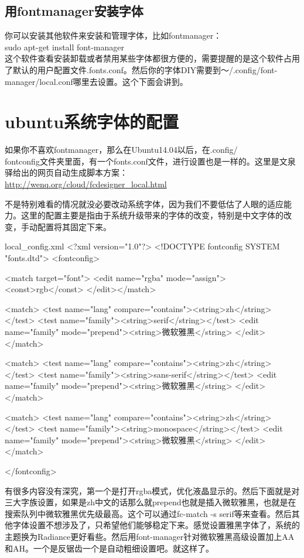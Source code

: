 \documentclass[11pt,oneside]{book}
\begin{document}
\subsection{用fontmanager安装字体}
你可以安装其他软件来安装和管理字体，比如fontmanager：\\
sudo  apt-get install font-manager  \\
这个软件查看安装卸载或者禁用某些字体都很方便的，需要提醒的是这个软件占用了默认的用户配置文件.fonts.conf。然后你的字体DIY需要到～/.config/font-manager/local.conf哪里去设置。这个下面会讲到。



\section{ubuntu系统字体的配置}
如果你不喜欢fontmanager，那么在Ubuntu14.04以后，在.config/\\fontconfig文件夹里面，有一个fonts.conf文件，进行设置也是一样的。这里是文泉驿给出的网页自动生成脚本方案：\\ \href{http://wenq.org/cloud/fcdesigner_local.html}{http://wenq.org/cloud/fcdesigner\_local.html}

不是特别难看的情况就没必要改动系统字体，因为我们不要低估了人眼的适应能力。这里的配置主要是指由于系统升级带来的字体的改变，特别是中文字体的改变，手动配置将其固定下来。
\begin{xverbatim}{local_config.xml}
<?xml version="1.0"?>
<!DOCTYPE fontconfig SYSTEM "fonts.dtd">
<fontconfig>

<match target="font">
	<edit name="rgba" mode="assign"><const>rgb</const>
	</edit></match>

<match>
	<test name="lang" compare="contains"><string>zh</string></test>
	<test name="family"><string>serif</string></test>
	<edit name="family" mode="prepend"><string>微软雅黑</string>
	</edit></match>

<match>
	<test name="lang" compare="contains"><string>zh</string></test>
	<test name="family"><string>sans-serif</string></test>
	<edit name="family" mode="prepend"><string>微软雅黑</string>
	</edit></match>

<match>
	<test name="lang" compare="contains"><string>zh</string></test>
	<test name="family"><string>monospace</string></test>
	<edit name="family" mode="prepend"><string>微软雅黑</string>
	</edit></match>	

</fontconfig>
\end{xverbatim}
有很多内容没有深究，第一个是打开rgba模式，优化液晶显示的。然后下面就是对三大字族设置，如果是zh中文的话那么就prepend也就是插入微软雅黑，也就是在搜索队列中微软雅黑优先级最高。这个可以通过fc-match  -s  serif等来查看。然后其他字体设置不想涉及了，只希望他们能够稳定下来。感觉设置雅黑字体了，系统的主题换为Radiance更好看些。然后用font-manager针对微软雅黑高级设置加上AA和AH。一个是反锯齿一个是自动粗细设置吧。就这样了。
\end{document}

